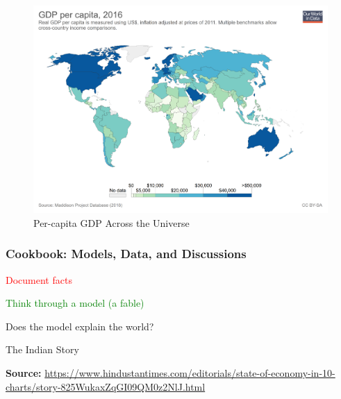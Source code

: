 \documentclass[shownotes,11pt, aspectratio=169]{beamer}
\newenvironment{wideitemize}{\itemize\addtolength{\itemsep}{10pt}}{\enditemize}
\begin{document}

\begin{frame}
\begin{figure}[ht]
  \caption*{Per-capita GDP Across the Universe}
    \includegraphics[width=.95\linewidth]{graphs/L1F8.png}
    \end{figure}
\end{frame}



\begin{frame}
\frametitle{Cookbook: Models, Data, and Discussions}
\begin{wideitemize}
\item \textcolor{red}{Document facts}
\item \textcolor{green}{Think through a model (a fable)}
\item Does the model explain the world?
\end{wideitemize}
\end{frame}

\begin{frame}{The Indian Story}
\begin{figure}
\end{figure}
\textbf{Source:} \url{https://www.hindustantimes.com/editorials/state-of-economy-in-10-charts/story-825WukaxZqGI09QM0z2NlJ.html}
\end{frame}
\end{document}
